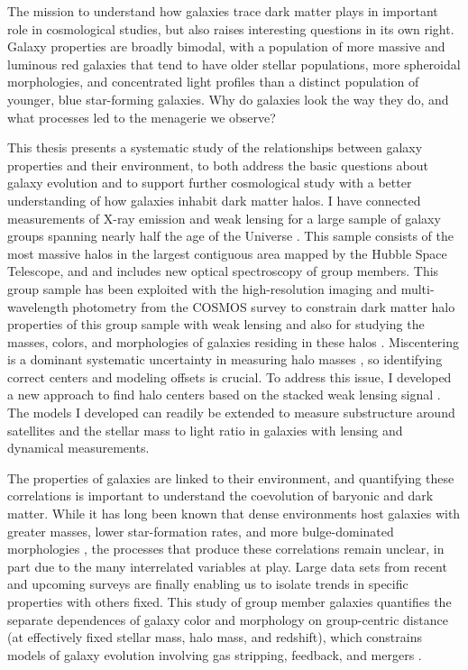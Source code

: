 The mission to understand how galaxies trace dark matter plays in
important role in cosmological studies, but also raises interesting
questions in its own right. Galaxy properties are broadly bimodal,
with a population of more massive and luminous red galaxies that tend
to have older stellar populations, more spheroidal morphologies, and
concentrated light profiles than a distinct population of younger,
blue star-forming galaxies. Why do galaxies look the way they do, and
what processes led to the menagerie we observe?

This thesis presents a systematic study of the relationships between
galaxy properties and their environment, to both address the basic
questions about galaxy evolution and to support further cosmological
study with a better understanding of how galaxies inhabit dark matter
halos. I have connected measurements of X-ray emission and weak
lensing for a large sample of galaxy groups spanning nearly half the
age of the Universe \citep{George2011}. This sample consists of the
most massive halos in the largest contiguous area mapped by the Hubble
Space Telescope, and and includes new optical spectroscopy of group
members. This group sample has been exploited with the high-resolution
imaging and multi-wavelength photometry from the COSMOS survey to
constrain dark matter halo properties of this group sample with weak
lensing \citep{Leauthaud2010, George2012, Schmidt2012, Ford2012,
  Taylor2012} and also for studying the masses, colors, and
morphologies of galaxies residing in these halos \citep{George2011,
  George2013, Leauthaud2012b}.  Miscentering is a dominant systematic
uncertainty in measuring halo masses \citep{Rozo2011}, so identifying
correct centers and modeling offsets is crucial. To address this
issue, I developed a new approach to find halo centers based on the
stacked weak lensing signal \citep{George2012}. The models I developed
can readily be extended to measure substructure around satellites and
the stellar mass to light ratio in galaxies with lensing and dynamical
measurements.

The properties of galaxies are linked to their environment, and
quantifying these correlations is important to understand the
coevolution of baryonic and dark matter. While it has long been known
that dense environments host galaxies with greater masses, lower
star-formation rates, and more bulge-dominated morphologies
\citep[see][for a review]{Blanton2009}, the processes that produce these
correlations remain unclear, in part due to the many interrelated
variables at play. Large data sets from recent and upcoming surveys
are finally enabling us to isolate trends in specific properties with
others fixed. This study of group member galaxies quantifies
the separate dependences of galaxy color and morphology on
group-centric distance (at effectively fixed stellar mass, halo mass,
and redshift), which constrains models of galaxy evolution involving
gas stripping, feedback, and mergers \citep{George2013}.

